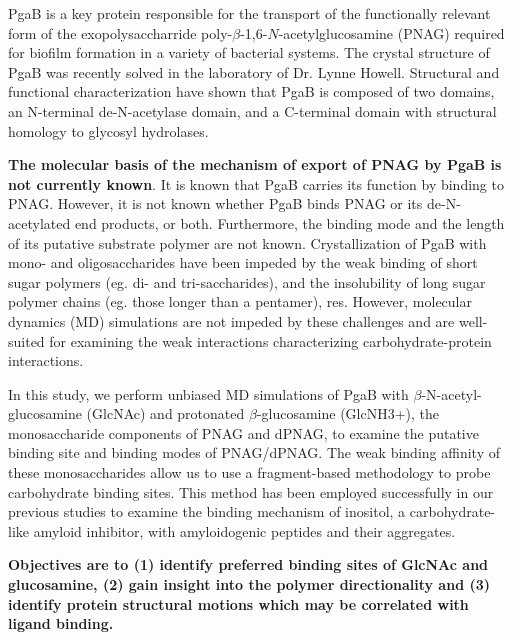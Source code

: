 PgaB is a key protein responsible for the transport of the functionally relevant form of the exopolysaccharride poly-$\beta$-1,6-$N$-acetylglucosamine (PNAG) required for biofilm formation in a variety of bacterial systems.\cite{Little:2012dp} The crystal structure of PgaB was recently solved in the laboratory of Dr. Lynne Howell.\cite{Little:2012dp} Structural and functional characterization have shown that PgaB is composed of two domains, an N-terminal de-N-acetylase domain, and a C-terminal domain with structural homology to glycosyl hydrolases.\cite{Little:2012dp}

\textbf{The molecular basis of the mechanism of export of PNAG by PgaB is not currently known}. It is known that PgaB carries its function by binding to PNAG. However, it is not known whether PgaB binds PNAG or its de-N-acetylated end products, or both. Furthermore, the binding mode and the length of its putative substrate polymer are not known. Crystallization of PgaB with mono- and oligosaccharides have been impeded by the weak binding of short sugar polymers (eg. di- and tri-saccharides), and the insolubility of long sugar polymer chains (eg. those longer than a pentamer), res. However, molecular dynamics (MD) simulations are not impeded by these challenges and are well-suited for examining the weak interactions characterizing carbohydrate-protein interactions.

In this study, we perform unbiased MD simulations of PgaB with $\beta$-N-acetyl-glucosamine (GlcNAc) and protonated $\beta$-glucosamine (GlcNH3+), the monosaccharide components of PNAG and dPNAG, to examine the putative binding site and binding modes of PNAG/dPNAG.  The weak binding affinity of these monosaccharides allow us to use a fragment-based methodology to probe carbohydrate binding sites.  This method has been employed successfully in our previous studies to examine the binding mechanism of inositol, a carbohydrate-like amyloid inhibitor, with amyloidogenic peptides and their aggregates.\cite{Li:2012bx,Li:2013Abreview}

\textbf{Objectives are to (1) identify preferred binding sites of GlcNAc and glucosamine, (2) gain insight into the polymer directionality and (3) identify protein structural motions which may be correlated with ligand binding.}


